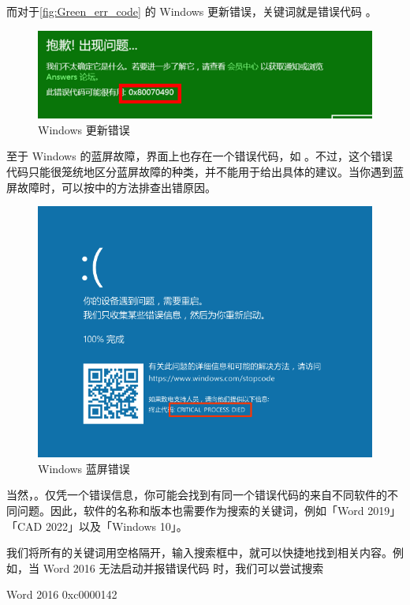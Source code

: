 而对于\autoref{fig:Green_err_code} 的 Windows 更新错误，关键词就是错误代码 。

\begin{figure}[htb!]
  \centering
  \includegraphics[width=.95\textwidth]{assets/basic/Green_err_code.png}
  \caption{Windows 更新错误}
  \label{fig:Green_err_code}
\end{figure}

至于 Windows 的蓝屏故障，界面上也存在一个错误代码，如 。不过，这个错误代码只能很笼统地区分蓝屏故障的种类，并不能用于给出具体的建议。当你遇到蓝屏故障时，可以按中的方法排查出错原因。

\begin{figure}[htb!]
  \centering
  \includegraphics[width=.65\textwidth]{assets/basic/Win-10-BSoD.png}
  \caption{Windows 蓝屏错误}
  \label{fig:Win-10-BSoD}
\end{figure}

当然，。仅凭一个错误信息，你可能会找到有同一个错误代码的来自不同软件的不同问题。因此，软件的名称和版本也需要作为搜索的关键词，例如「Word 2019」「CAD 2022」以及「Windows 10」。

我们将所有的关键词用空格隔开，输入搜索框中，就可以快捷地找到相关内容。例如，当 Word 2016 无法启动并报错误代码  时，我们可以尝试搜索

\begin{quoting}
  Word 2016 0xc0000142
\end{quoting}

